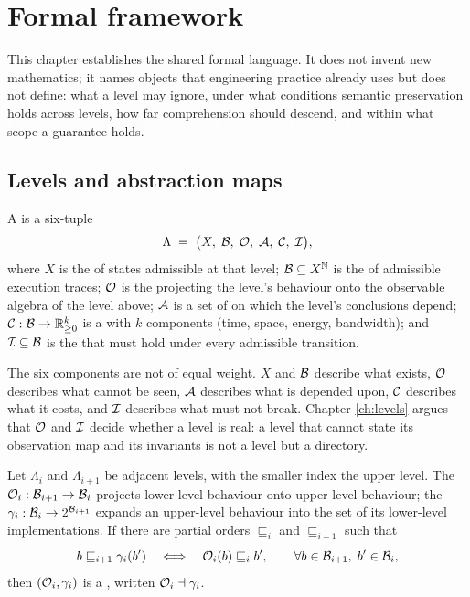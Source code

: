 \chapter{Formal framework}\label{ch:framework}

This chapter establishes the shared formal language. It does not invent new mathematics;
it names objects that engineering practice already uses but does not define: what a level
may ignore, under what conditions semantic preservation holds across levels, how far
comprehension should descend, and within what scope a guarantee holds.

\section{Levels and abstraction maps}\label{sec:level}

\begin{definition}[Level]\label{def:level}
A  is a six-tuple
\[
\Lambda \;=\; \bigl(X,\; \mathcal{B},\; \mathcal{O},\; \mathcal{A},\; \mathcal{C},\; \mathcal{I}\bigr),
\]
where $X$ is the  of states admissible at that level;
$\mathcal{B} \subseteq X^{\mathbb{N}}$ is the  of admissible execution
traces; $\mathcal{O}$ is the  projecting the level's behaviour onto the
observable algebra of the level above; $\mathcal{A}$ is a set of 
on which the level's conclusions depend; $\mathcal{C} : \mathcal{B} \to \mathbb{R}_{\ge 0}^{k}$ is a
 with $k$ components (time, space, energy, bandwidth); and
$\mathcal{I} \subseteq \mathcal{B}$ is the  that must hold under every admissible
transition.
\end{definition}

The six components are not of equal weight. $X$ and $\mathcal{B}$ describe what exists, $\mathcal{O}$
describes what cannot be seen, $\mathcal{A}$ describes what is depended upon, $\mathcal{C}$ describes
what it costs, and $\mathcal{I}$ describes what must not break. Chapter \ref{ch:levels} argues
that $\mathcal{O}$ and $\mathcal{I}$ decide whether a level is real: a level that cannot state its
observation map and its invariants is not a level but a directory.

\begin{definition}\label{def:galois}
Let $\Lambda_i$ and $\Lambda_{i+1}$ be adjacent levels, with the smaller index the upper
level. The  $\mathcal{O}_i : \mathcal{B}_{i+1} \to \mathcal{B}_i$ projects lower-level
behaviour onto upper-level behaviour; the 
$\gamma_i : \mathcal{B}_i \to 2^{\mathcal{B}_{i+1}}$ expands an upper-level behaviour into the set of its
lower-level implementations. If there are partial orders $\sqsubseteq_i$ and
$\sqsubseteq_{i+1}$ such that
\begin{equation}\label{eq:galois}
b \sqsubseteq_{i+1} \gamma_i(b') \quad\Longleftrightarrow\quad \mathcal{O}_i(b) \sqsubseteq_i b',
\qquad \forall b \in \mathcal{B}_{i+1},\; b' \in \mathcal{B}_i,
\end{equation}
then $(\mathcal{O}_i, \gamma_i)$ is a , written $\mathcal{O}_i \dashv \gamma_i$.
\end{definition}

